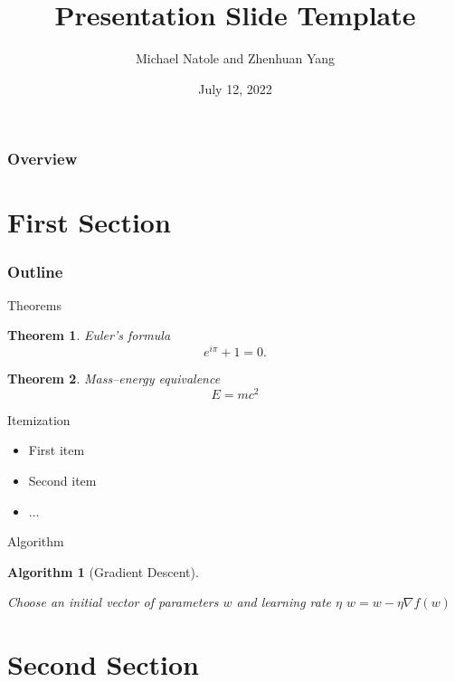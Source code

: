 \documentclass{beamer}
\title[Presentation]{Presentation Slide Template}
\author[MNZY]{Michael Natole and Zhenhuan Yang}
\institute[UAlbany]{Department of Mathematics \& Statistics\\University at Albany, SUNY}
\date{July 12, 2022}
\theoremstyle{mystyle}
\newtheorem{thm}{Theorem}
\newtheorem{code}{Algorithm}
\begin{document}
% 


\begin{frame}
	\titlepage
\end{frame}


\begin{frame}
	\frametitle{Overview}
	\tableofcontents
\end{frame}

\section[First]{First Section}

\begin{frame}
	\frametitle{Outline}
	\tableofcontents[currentsection]
\end{frame}

\begin{frame}{Theorems}
\begin{thm}\label{thm:euler}
Euler's formula
\[
	e^{i\pi} + 1 = 0.
\]
\end{thm}
\begin{thm}\label{thm:einstein}
Mass–energy equivalence
\[
	E = mc^2
\]
\end{thm}
\end{frame}

\begin{frame}{Itemization}
\begin{itemize}
\item First item 
\item Second item
\item ...	
\end{itemize}
	
\end{frame}

\begin{frame}{Algorithm}
\begin{code}[Gradient Descent]
\begin{algorithmic}[1]
\STATE Choose an initial vector of parameters $w$ and learning rate $\eta$
\STATE $w = w - \eta\nabla f(w)$
\ENDWHILE
\end{algorithmic}
\end{code}

\end{frame}


\section[Second]{Second Section}
\end{document}
